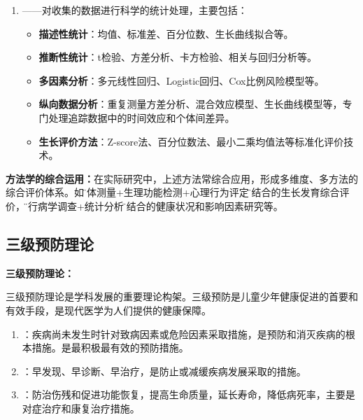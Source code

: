 \begin{defbox}
\begin{enumerate}[leftmargin=*]
    \item {}——对收集的数据进行科学的统计处理，主要包括：
        \begin{itemize}
            \item \textbf{描述性统计}：均值、标准差、百分位数、生长曲线拟合等。
            \item \textbf{推断性统计}：t检验、方差分析、卡方检验、相关与回归分析等。
            \item \textbf{多因素分析}：多元线性回归、Logistic回归、Cox比例风险模型等。
            \item \textbf{纵向数据分析}：重复测量方差分析、混合效应模型、生长曲线模型等，专门处理追踪数据中的时间效应和个体间差异。
            \item \textbf{生长评价方法}：Z-score法、百分位数法、最小二乘均值法等标准化评价技术。
        \end{itemize}
\end{enumerate}

\textbf{方法学的综合运用：}在实际研究中，上述方法常综合应用，形成多维度、多方法的综合评价体系。如\"人体测量+生理功能检测+心理行为评定\"相结合的生长发育综合评价，\"流行病学调查+统计分析\"相结合的健康状况和影响因素研究等。
\end{defbox}

\subsection{三级预防理论}

\begin{keybox}
\textbf{三级预防理论：}

三级预防理论是学科发展的重要理论构架。三级预防是儿童少年健康促进的首要和有效手段，是现代医学为人们提供的健康保障。

\begin{enumerate}[leftmargin=*]
    \item {}：疾病尚未发生时针对致病因素或危险因素采取措施，是预防和消灭疾病的根本措施。是最积极最有效的预防措施。

    \item {}：早发现、早诊断、早治疗，是防止或减缓疾病发展采取的措施。

    \item {}：防治伤残和促进功能恢复，提高生命质量，延长寿命，降低病死率，主要是对症治疗和康复治疗措施。
\end{enumerate}
\end{keybox}

\newpage
